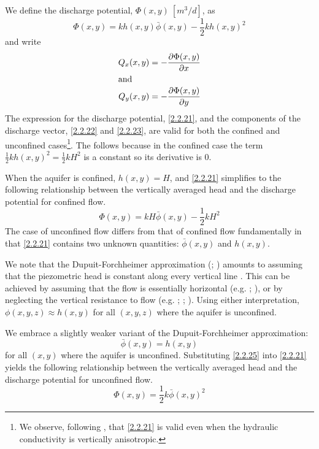 \documentclass[12pt]{report}
\providecommand{\pderiv}[2]{\frac{\mathinner{\partial#1}}{\mathinner{\partial#2}}}
\begin{document}
We define the discharge potential, $\Phi(x,y)~[m^3/d]$, as
%
\begin{equation}\label{2.2.21}
    \Phi(x,y) = kh(x,y) \bar{\phi}(x,y) - \frac{1}{2}k h(x,y)^2
\end{equation}
%
and write
%
\begin{align}
    Q_x(x,y) &= - \pderiv{\Phi(x,y)}{x} \label{2.2.22}\\
    \intertext{and}
    Q_y(x,y) &= - \pderiv{\Phi(x,y)}{y} \label{2.2.23}
\end{align}
%
The expression for the discharge potential, \eqref{2.2.21}, and the components of the discharge vector, \eqref{2.2.22} and \eqref{2.2.23}, are valid for both the confined and unconfined cases\footnote{We observe, following \citet{Youngs66b}, that \eqref{2.2.21} is valid even when the hydraulic conductivity is vertically anisotropic.}. The follows because in the confined case the term $\frac{1}{2}k h(x,y)^2 = \frac{1}{2}k H^2$ is a constant so its derivative is $0$.

When the aquifer is confined, $h(x,y) = H$, and \eqref{2.2.21} simplifies to the following relationship between the vertically averaged head and the discharge potential for confined flow.
%
\begin{equation}\label{2.2.24}
\boxed{
    \Phi(x,y) = kH\bar{\phi}(x,y) - \frac{1}{2}k H^2
}
\end{equation}
%
The case of unconfined flow differs from that of confined flow fundamentally in that \eqref{2.2.21} contains two unknown quantities: $\bar{\phi}(x,y)$ and $h(x,y)$.

We note that the Dupuit-Forchheimer approximation (\citet{Dupuit1863}; \citet{Forchheimer1886}) amounts to assuming that the piezometric head is constant along every vertical line \citep[p. 362]{Bear72}. This can be achieved by assuming that the flow is essentially horizontal (e.g. \citet[p. 404-407]{Polubarinova62}; \citet{Murray73}), or by neglecting the vertical resistance to flow (e.g. \citet{Kirkham67}; \citet{Strack84}; \citet[21-24]{Haitjema1995}). Using either interpretation, $\phi(x,y,z) \approx h(x,y)$ for all $(x,y,z)$ where the aquifer is unconfined.

We embrace a slightly weaker variant of the Dupuit-Forchheimer approximation:
%
\begin{equation}\label{2.2.25}
    \bar{\phi}(x,y) = h(x,y)
\end{equation}
%
for all $(x,y)$ where the aquifer is unconfined. Substituting \eqref{2.2.25} into \eqref{2.2.21} yields the following relationship between the vertically averaged head and the discharge potential for unconfined flow.
%
\begin{equation}\label{2.2.26}
\boxed{
    \Phi(x,y) = \frac{1}{2}k \bar{\phi}(x,y)^2
}
\end{equation}
\end{document}
